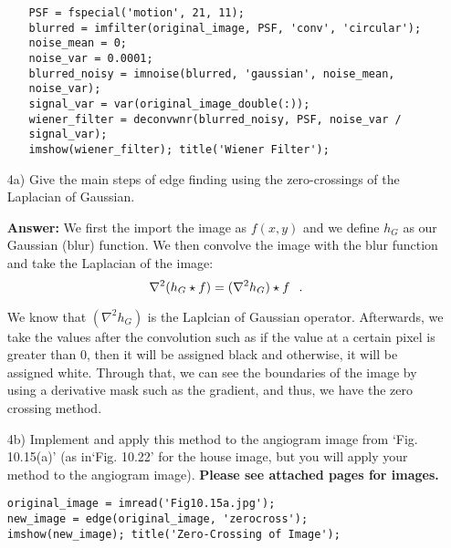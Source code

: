 \documentclass{article}
\begin{document}
\begin{enumerate}
\begin{enumerate}
\begin{lstlisting}
PSF = fspecial('motion', 21, 11);
blurred = imfilter(original_image, PSF, 'conv', 'circular');
noise_mean = 0;
noise_var = 0.0001;
blurred_noisy = imnoise(blurred, 'gaussian', noise_mean, noise_var);
signal_var = var(original_image_double(:));
wiener_filter = deconvwnr(blurred_noisy, PSF, noise_var / signal_var);
imshow(wiener_filter); title('Wiener Filter');
\end{lstlisting}

\end{enumerate}

\newpage
\item[4a)] Give the main steps of edge finding using the zero-crossings of the Laplacian of
Gaussian.

\textbf{Answer: }We first the import the image as $f(x,y)$ and we define $h_G$ as our Gaussian (blur) function. We then convolve the image with the blur function and take the Laplacian of the image:
$$\nabla ^2(h_G \star f) = (\nabla ^ 2 h_G) \star f \hspace{0.1in} .$$

We know that $ (\nabla ^ 2 h_G)$ is the Laplcian of Gaussian operator. Afterwards, we take the values after the convolution such as if the value at a certain pixel is greater than 0, then it will be assigned black and otherwise, it will be assigned white.
Through that, we can see the boundaries of the image by using a derivative mask such as the gradient, and thus, we have the zero crossing method.

\item[4b)] Implement and apply this method to the angiogram image from `Fig. 10.15(a)' (as in`Fig. 10.22' for the house image, but you will apply your method to the angiogram image).\newline
\textbf{Please see attached pages for images.}

\begin{lstlisting}
original_image = imread('Fig10.15a.jpg');
new_image = edge(original_image, 'zerocross');
imshow(new_image); title('Zero-Crossing of Image');
\end{lstlisting}

\end{enumerate}
\end{document}
